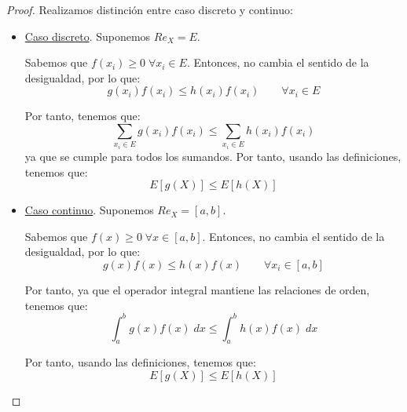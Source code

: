 \begin{proof}
    Realizamos distinción entre caso discreto y continuo:
    \begin{itemize}
        \item \underline{Caso discreto}. Suponemos $Re_X = E$.

        Sabemos que $f(x_i)\geq 0 \;\forall x_i\in E$. Entonces, no cambia el sentido de la desigualdad, por lo que:
        \begin{equation*}
            g(x_i)f(x_i)\leq h(x_i)f(x_i) \qquad \forall x_i\in E
        \end{equation*}

        Por tanto, tenemos que:
        \begin{equation*}
            \sum_{x_i\in E}g(x_i)f(x_i)\leq \sum_{x_i\in E} h(x_i)f(x_i)
        \end{equation*}
        ya que se cumple para todos los sumandos. Por tanto, usando las definiciones, tenemos que:
        \begin{equation*}
            E[g(X)]\leq E[h(X)]
        \end{equation*}

        \item \underline{Caso continuo}. Suponemos $Re_X = [a,b]$.

        Sabemos que $f(x)\geq 0 \;\forall x\in [a,b]$. Entonces, no cambia el sentido de la desigualdad, por lo que:
        \begin{equation*}
            g(x)f(x)\leq h(x)f(x) \qquad \forall x_i\in [a,b]
        \end{equation*}

        Por tanto, ya que el operador integral mantiene las relaciones de orden, tenemos que:
        \begin{equation*}
            \int_a^b g(x)f(x)\;dx\leq \int_a^b h(x)f(x)\;dx
        \end{equation*}
        
        Por tanto, usando las definiciones, tenemos que:
        \begin{equation*}
            E[g(X)]\leq E[h(X)]
        \end{equation*}
    \end{itemize}
\end{proof}



